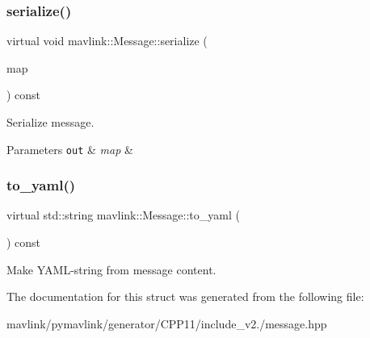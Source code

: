 \subsubsection{\texorpdfstring{serialize()}{serialize()}}
{\footnotesize\ttfamily virtual void mavlink\+::\+Message\+::serialize (\begin{DoxyParamCaption}\item[{\hyperlink{classmavlink_1_1MsgMap}{Msg\+Map} \&}]{map }\end{DoxyParamCaption}) const\hspace{0.3cm}{\ttfamily [pure virtual]}}

Serialize message.


\begin{DoxyParams}[1]{Parameters}
\mbox{\tt out}  & {\em map} & \\
\hline
\end{DoxyParams}
\mbox{\label{structmavlink_1_1Message_a6a2a01c5fdb6e6039a89f43923085e81}} 
\subsubsection{\texorpdfstring{to\+\_\+yaml()}{to\_yaml()}}
{\footnotesize\ttfamily virtual std\+::string mavlink\+::\+Message\+::to\+\_\+yaml (\begin{DoxyParamCaption}\item[{void}]{ }\end{DoxyParamCaption}) const\hspace{0.3cm}{\ttfamily [pure virtual]}}

Make Y\+A\+M\+L-\/string from message content. 

The documentation for this struct was generated from the following file\+:\begin{DoxyCompactItemize}
\item 
mavlink/pymavlink/generator/\+C\+P\+P11/include\+\_\+v2./message.\+hpp\end{DoxyCompactItemize}
